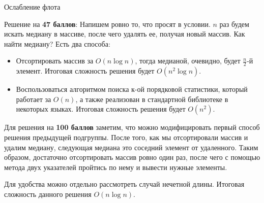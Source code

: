 \begin{tutorial}{Ослабление флота}

Решение на \textbf{47 баллов}: Напишем ровно то, что просят в условии. $n$ раз будем искать медиану в массиве, после чего удалять ее, получая новый массив. Как найти медиану?
Есть два способа:
\begin{itemize}
\item Отсортировать массив за $O(n \log n)$, тогда медианой, очевидно, будет $\frac{n}{2}$-й элемент. Итоговая сложность решения будет $O(n^2 \log n)$.
\item Воспользоваться алгоритмом поиска к-ой порядковой статистики, который работает за $O(n)$, а также реализован в стандартной библиотеке в некоторых языках. Итоговая сложность решения будет $O(n^2)$.
\end{itemize}


Для решения на \textbf{100 баллов} заметим, что можно модифицировать первый способ решения предыдущей подгруппы. После того, как мы отсортировали массив и удалим медиану, следующая медиана это соседний элемент от удаленного. Таким образом, достаточно отсортировать массив ровно один раз, после чего с помощью метода двух указателей пройтись по нему и вывести нужные элементы.

Для удобства можно отдельно рассмотреть случай нечетной длины. Итоговая сложность данного решения $O(n \log n)$.

\end{tutorial}
